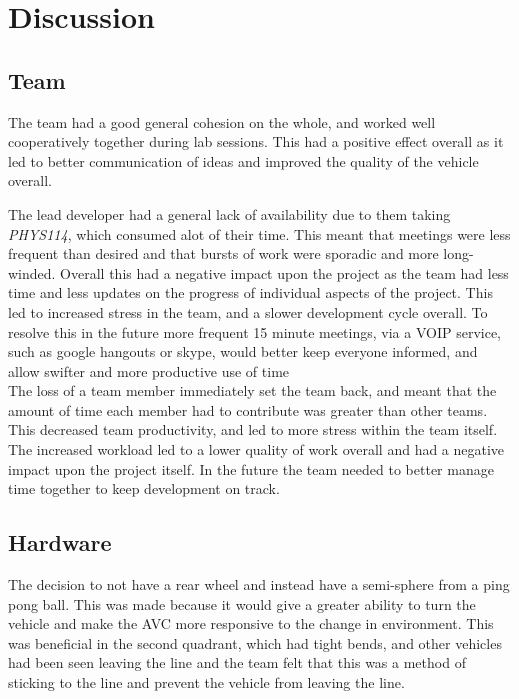\documentclass[paper=a4, fontsize=11pt]{scrartcl} %
\numberwithin{equation}{section} %
\numberwithin{figure}{section} %
\begin{document}
\section{Discussion}
\subsection{Team}
The team had a good general cohesion on the whole, and worked well cooperatively
together during lab sessions. This had a positive effect overall as it led to
better communication of ideas and improved the quality of the vehicle overall.

The lead developer had a general lack of availability due to them
taking \textit{PHYS114}, which consumed alot of their time. This meant that
meetings were less frequent than desired and that bursts of work were
sporadic and more long-winded. Overall this had a negative impact upon the
project as the team had less time and less updates on the progress of individual
aspects of the project.  This led to increased stress in the team, and a slower
development cycle overall. To resolve this in the future more frequent 15 minute
meetings, via a VOIP service, such as google hangouts or skype, would better
keep everyone informed, and allow swifter and more productive use of time\\

The loss of a team member immediately set the team back, and meant that the
amount of time each member had to contribute was greater than other teams. This
decreased team productivity, and led to more stress within the team itself. The
increased workload led to a lower quality of work overall and had a negative
impact upon the project itself. In the future the team needed to better manage
time together to keep development on track.\\

\subsection{Hardware}
The decision to not have a rear wheel and instead have a semi-sphere from a ping
pong ball. This was made because it would give a greater ability to turn the
vehicle and make the AVC more responsive to the change in environment. This was
beneficial in the second quadrant, which had tight bends, and other vehicles had
been seen leaving the line and the team felt that this was a method of sticking
to the line and prevent the vehicle from leaving the line.\\
\end{document}
